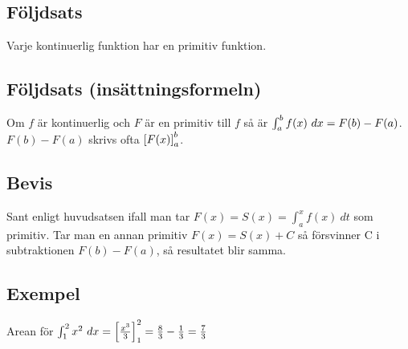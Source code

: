 \documentclass{article}
\newcommand{\intx}[1]{\int^x_a{#1\ dt}}
\begin{document}
\subsection{Följdsats}
Varje kontinuerlig funktion har en primitiv funktion.

\subsection{Följdsats (insättningsformeln)}
Om $f$ är kontinuerlig och $F$ är en primitiv till $f$ så är $\int^b_a{f(x)\ dx} = F(b)-F(a)$.\\
$ F(b)-F(a) $ skrivs ofta $\left[F(x)\right]_a^b$.

\subsection{Bevis}
Sant enligt huvudsatsen ifall man tar $F(x)=S(x)=\intx{f(x)}$ som primitiv.
Tar man en annan primitiv $F(x)=S(x)+C$ så försvinner C i subtraktionen $F(b)-F(a)$,
så resultatet blir samma.

\subsection{Exempel}
Arean för $\int^2_1{x^2\ dx} = \left[\frac{x^3}{3}\right]^2_1 = \frac{8}{3} - \frac{1}{3} = \frac{7}{3} $
\end{document}
